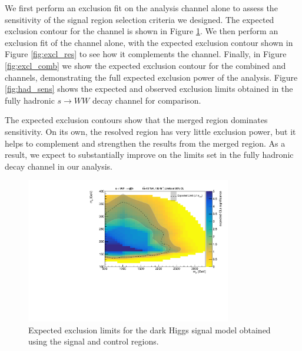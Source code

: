 We first perform an exclusion fit on the \merged analysis channel alone to assess the sensitivity of the \merged signal region selection criteria we designed. The expected exclusion contour for the \merged channel is shown in Figure \ref{fig:excl_mgd}. We then perform an exclusion fit of the \resolved channel alone, with the expected exclusion contour shown in Figure \ref{fig:excl_res} to see how it complements the \merged channel. Finally, in Figure \ref{fig:excl_comb} we show the expected exclusion contour for the combined \merged and \resolved channels, demonstrating the full expected exclusion power of the analysis. Figure \ref{fig:had_sens} shows the expected and observed exclusion limits obtained in the fully hadronic $s\rightarrow WW$ decay channel for comparison.

The expected exclusion contours show that the merged region dominates sensitivity. On its own, the resolved region has very little exclusion power, but it helps to complement and strengthen the results from the merged region. As a result, we expect to substantially improve on the limits set in the fully hadronic decay channel in our analysis.

\begin{figure}[h]
    \centering
    \includegraphics[width=0.8\textwidth]{Figures/5/fits/MERGED.pdf}
    \caption{Expected exclusion limits for the dark Higgs signal model obtained using the \merged signal and control regions.}
    \label{fig:excl_mgd}
\end{figure}

